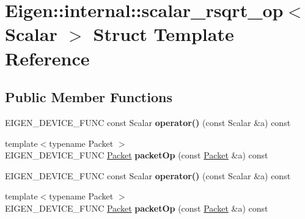 \hypertarget{struct_eigen_1_1internal_1_1scalar__rsqrt__op}{}\section{Eigen\+:\+:internal\+:\+:scalar\+\_\+rsqrt\+\_\+op$<$ Scalar $>$ Struct Template Reference}
\label{struct_eigen_1_1internal_1_1scalar__rsqrt__op}
\subsection*{Public Member Functions}
\begin{DoxyCompactItemize}
\item 
\mbox{\label{struct_eigen_1_1internal_1_1scalar__rsqrt__op_a9bcf69ff147f7f02a535c4ca8e09c39b}} 
E\+I\+G\+E\+N\+\_\+\+D\+E\+V\+I\+C\+E\+\_\+\+F\+U\+NC const Scalar {\bfseries operator()} (const Scalar \&a) const
\item 
\mbox{\label{struct_eigen_1_1internal_1_1scalar__rsqrt__op_ae2bfe3c291802ee0932e37d0850e3ffc}} 
{\footnotesize template$<$typename Packet $>$ }\\E\+I\+G\+E\+N\+\_\+\+D\+E\+V\+I\+C\+E\+\_\+\+F\+U\+NC \hyperlink{union_eigen_1_1internal_1_1_packet}{Packet} {\bfseries packet\+Op} (const \hyperlink{union_eigen_1_1internal_1_1_packet}{Packet} \&a) const
\item 
\mbox{\label{struct_eigen_1_1internal_1_1scalar__rsqrt__op_a9bcf69ff147f7f02a535c4ca8e09c39b}} 
E\+I\+G\+E\+N\+\_\+\+D\+E\+V\+I\+C\+E\+\_\+\+F\+U\+NC const Scalar {\bfseries operator()} (const Scalar \&a) const
\item 
\mbox{\label{struct_eigen_1_1internal_1_1scalar__rsqrt__op_ae2bfe3c291802ee0932e37d0850e3ffc}} 
{\footnotesize template$<$typename Packet $>$ }\\E\+I\+G\+E\+N\+\_\+\+D\+E\+V\+I\+C\+E\+\_\+\+F\+U\+NC \hyperlink{union_eigen_1_1internal_1_1_packet}{Packet} {\bfseries packet\+Op} (const \hyperlink{union_eigen_1_1internal_1_1_packet}{Packet} \&a) const
\end{DoxyCompactItemize}


